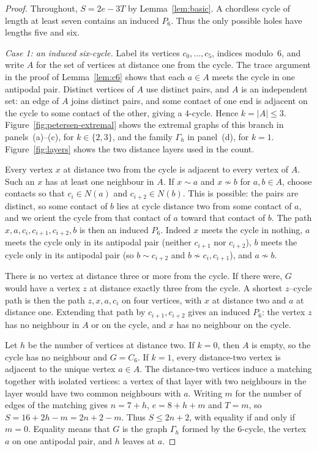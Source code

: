 \documentclass[ASNA]{USG}
\theoremstyle{WBstyletwo}
\numberwithin{equation}{section}
\begin{document}
\begin{proof}
Throughout, $S=2e-3T$ by Lemma~\ref{lem:basic}. A chordless cycle of length at least seven contains an induced $P_6$. Thus the only possible holes have lengths five and six.

\emph{Case 1: an induced six-cycle.}
Label its vertices $c_0,\dots,c_5$, indices modulo~$6$, and write $A$ for the set of vertices at distance one from the cycle. The trace argument in the proof of Lemma~\ref{lem:c6} shows that each $a\in A$ meets the cycle in one antipodal pair. Distinct vertices of $A$ use distinct pairs, and $A$ is an independent set: an edge of $A$ joins distinct pairs, and some contact of one end is adjacent on the cycle to some contact of the other, giving a $4$-cycle. Hence $k=|A|\le 3$. Figure~\ref{fig:petersen-extremal} shows the extremal graphs of this branch in panels~(a)--(c), for $k\in\{2,3\}$, and the family $\Gamma_h$ in panel~(d), for $k=1$. Figure~\ref{fig:layers} shows the two distance layers used in the count.

Every vertex $x$ at distance two from the cycle is adjacent to every vertex of $A$. Such an $x$ has at least one neighbour in $A$. If $x\sim a$ and $x\nsim b$ for $a,b\in A$, choose contacts so that $c_i\in N(a)$ and $c_{i+2}\in N(b)$. This is possible: the pairs are distinct, so some contact of $b$ lies at cycle distance two from some contact of $a$, and we orient the cycle from that contact of $a$ toward that contact of $b$. The path $x,a,c_i,c_{i+1},c_{i+2},b$ is then an induced $P_6$. Indeed $x$ meets the cycle in nothing, $a$ meets the cycle only in its antipodal pair (neither $c_{i+1}$ nor $c_{i+2}$), $b$ meets the cycle only in its antipodal pair (so $b\sim c_{i+2}$ and $b\nsim c_i,c_{i+1}$), and $a\nsim b$.

There is no vertex at distance three or more from the cycle. If there were, $G$ would have a vertex $z$ at distance exactly three from the cycle. A shortest $z$--cycle path is then the path $z,x,a,c_i$ on four vertices, with $x$ at distance two and $a$ at distance one. Extending that path by $c_{i+1},c_{i+2}$ gives an induced $P_6$: the vertex $z$ has no neighbour in $A$ or on the cycle, and $x$ has no neighbour on the cycle.

Let $h$ be the number of vertices at distance two. If $k=0$, then $A$ is empty, so the cycle has no neighbour and $G=C_6$. If $k=1$, every distance-two vertex is adjacent to the unique vertex $a\in A$. The distance-two vertices induce a matching together with isolated vertices: a vertex of that layer with two neighbours in the layer would have two common neighbours with $a$. Writing $m$ for the number of edges of the matching gives $n=7+h$, $e=8+h+m$ and $T=m$, so $S=16+2h-m=2n+2-m$. Thus $S\le 2n+2$, with equality if and only if $m=0$. Equality means that $G$ is the graph $\Gamma_h$ formed by the $6$-cycle, the vertex $a$ on one antipodal pair, and $h$ leaves at $a$.


\end{proof}
\end{document}
